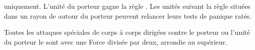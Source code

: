 \armymagicalbanners

\startpricelist

\infantry{} uniquement. L'unité du porteur gagne la règle \vanguard{}. Les unités suivant la règle \unruly{} situées dans un rayon de  autour du porteur peuvent relancer leurs tests de panique ratés.

Toutes les attaques spéciales de corps à corps dirigées contre le porteur ou l'unité du porteur le sont avec une Force divisée par deux, arrondie au supérieur.

\endpricelist

\closearmymagicalitems




